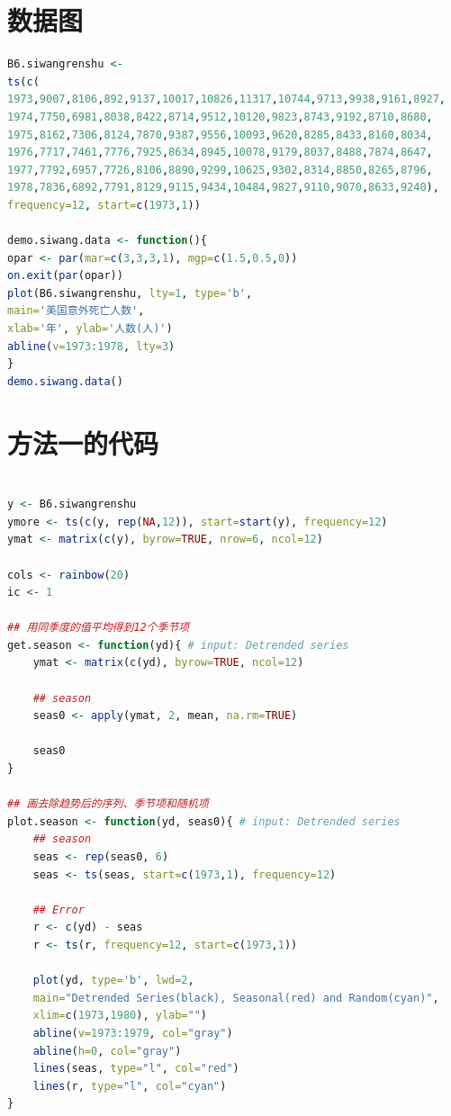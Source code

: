 \documentclass[11pt,a4paper]{ctexart}
\begin{document}
\begin{appendices}
	
\section{数据图}
\begin{lstlisting}[language=r]
B6.siwangrenshu <-
ts(c(
1973,9007,8106,892,9137,10017,10826,11317,10744,9713,9938,9161,8927,
1974,7750,6981,8038,8422,8714,9512,10120,9823,8743,9192,8710,8680,
1975,8162,7306,8124,7870,9387,9556,10093,9620,8285,8433,8160,8034,
1976,7717,7461,7776,7925,8634,8945,10078,9179,8037,8488,7874,8647,
1977,7792,6957,7726,8106,8890,9299,10625,9302,8314,8850,8265,8796,
1978,7836,6892,7791,8129,9115,9434,10484,9827,9110,9070,8633,9240),
frequency=12, start=c(1973,1))

demo.siwang.data <- function(){
opar <- par(mar=c(3,3,3,1), mgp=c(1.5,0.5,0))
on.exit(par(opar))
plot(B6.siwangrenshu, lty=1, type='b',
main='美国意外死亡人数',
xlab='年', ylab='人数(人)')
abline(v=1973:1978, lty=3)
}
demo.siwang.data()
\end{lstlisting}
\section{方法一的代码}
\begin{lstlisting}[language=r]
		
y <- B6.siwangrenshu
ymore <- ts(c(y, rep(NA,12)), start=start(y), frequency=12)
ymat <- matrix(c(y), byrow=TRUE, nrow=6, ncol=12)

cols <- rainbow(20)
ic <- 1

## 用同季度的值平均得到12个季节项
get.season <- function(yd){ # input: Detrended series
	ymat <- matrix(c(yd), byrow=TRUE, ncol=12)
	
	## season
	seas0 <- apply(ymat, 2, mean, na.rm=TRUE)
	
	seas0
}

## 画去除趋势后的序列、季节项和随机项
plot.season <- function(yd, seas0){ # input: Detrended series
	## season
	seas <- rep(seas0, 6)
	seas <- ts(seas, start=c(1973,1), frequency=12)
	
	## Error
	r <- c(yd) - seas
	r <- ts(r, frequency=12, start=c(1973,1))
	
	plot(yd, type='b', lwd=2,
	main="Detrended Series(black), Seasonal(red) and Random(cyan)",
	xlim=c(1973,1980), ylab="")
	abline(v=1973:1979, col="gray")
	abline(h=0, col="gray")
	lines(seas, type="l", col="red")
	lines(r, type="l", col="cyan")
}	
	

\end{lstlisting}
\end{appendices}
\end{document}

